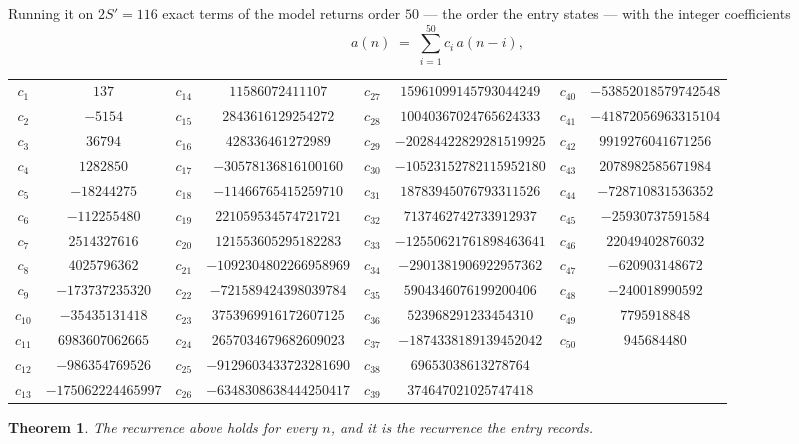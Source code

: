 \documentclass[11pt,a4paper]{article}
\theoremstyle{plain}
\newtheorem{theorem}{Theorem}
\theoremstyle{definition}
\begin{document}
Running it on $2S'=116$ exact terms of the model returns order $50$ --- the order the
entry states --- with the integer coefficients
\[
a(n)\;=\;\sum_{i=1}^{50}c_i\,a(n-i),
\]
\begin{center}\small
\begin{tabular}{cccccccc}
$c_{1}$ & $137$ & $c_{14}$ & $11586072411107$ & $c_{27}$ & $15961099145793044249$ & $c_{40}$ & $-53852018579742548$ \\
$c_{2}$ & $-5154$ & $c_{15}$ & $2843616129254272$ & $c_{28}$ & $10040367024765624333$ & $c_{41}$ & $-41872056963315104$ \\
$c_{3}$ & $36794$ & $c_{16}$ & $428336461272989$ & $c_{29}$ & $-20284422829281519925$ & $c_{42}$ & $9919276041671256$ \\
$c_{4}$ & $1282850$ & $c_{17}$ & $-30578136816100160$ & $c_{30}$ & $-10523152782115952180$ & $c_{43}$ & $2078982585671984$ \\
$c_{5}$ & $-18244275$ & $c_{18}$ & $-11466765415259710$ & $c_{31}$ & $18783945076793311526$ & $c_{44}$ & $-728710831536352$ \\
$c_{6}$ & $-112255480$ & $c_{19}$ & $221059534574721721$ & $c_{32}$ & $7137462742733912937$ & $c_{45}$ & $-25930737591584$ \\
$c_{7}$ & $2514327616$ & $c_{20}$ & $121553605295182283$ & $c_{33}$ & $-12550621761898463641$ & $c_{46}$ & $22049402876032$ \\
$c_{8}$ & $4025796362$ & $c_{21}$ & $-1092304802266958969$ & $c_{34}$ & $-2901381906922957362$ & $c_{47}$ & $-620903148672$ \\
$c_{9}$ & $-173737235320$ & $c_{22}$ & $-721589424398039784$ & $c_{35}$ & $5904346076199200406$ & $c_{48}$ & $-240018990592$ \\
$c_{10}$ & $-35435131418$ & $c_{23}$ & $3753969916172607125$ & $c_{36}$ & $523968291233454310$ & $c_{49}$ & $7795918848$ \\
$c_{11}$ & $6983607062665$ & $c_{24}$ & $2657034679682609023$ & $c_{37}$ & $-1874338189139452042$ & $c_{50}$ & $945684480$ \\
$c_{12}$ & $-986354769526$ & $c_{25}$ & $-9129603433723281690$ & $c_{38}$ & $69653038613278764$ &  &  \\
$c_{13}$ & $-175062224465997$ & $c_{26}$ & $-6348308638444250417$ & $c_{39}$ & $374647021025747418$ &  &  \\
\end{tabular}
\end{center}

\begin{theorem}
The recurrence above holds for every $n$, and it is the recurrence the entry records.
\end{theorem}
\end{document}

